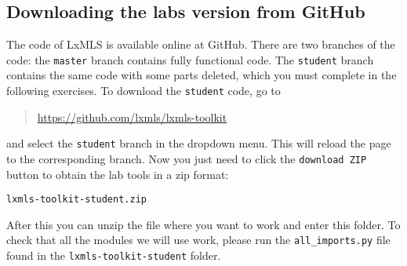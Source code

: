 \subsection{Downloading the labs version from GitHub}

The code of LxMLS is available online at GitHub. There are two branches of the
code: the \verb+master+ branch contains fully functional code. The
\verb+student+ branch contains the same code with some parts deleted, which you
must complete in the following exercises. To download the \verb+student+ code,
go to

\begin{quotation}
\url{https://github.com/lxmls/lxmls-toolkit}
\end{quotation}

\noindent and select the \verb+student+ branch in the dropdown menu. This will
reload the page to the corresponding branch. Now you just need to click the
\verb+download ZIP+ button to obtain the lab tools in a zip format:

\begin{verbatim}
lxmls-toolkit-student.zip
\end{verbatim}

After this you can unzip the file where you want to work and enter this folder.
To check that all the modules we will use work, please run the
\verb+all_imports.py+ file found in the \verb+lxmls-toolkit-student+ folder.
